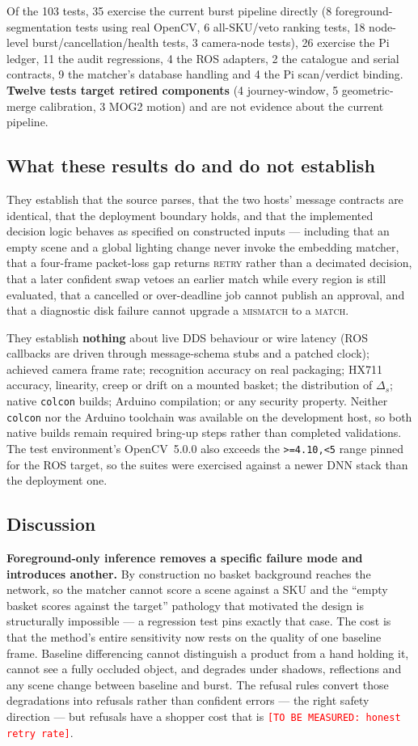 \documentclass[conference]{IEEEtran}
\newcommand{\tbm}[1]{\textcolor{red}{\texttt{[TO BE MEASURED: #1]}}}
\begin{document}
Of the 103 tests, 35 exercise the current burst pipeline directly (8 foreground-segmentation tests
using real OpenCV, 6 all-SKU/veto ranking tests, 18 node-level burst/cancellation/health tests, 3
camera-node tests), 26 exercise the Pi ledger, 11 the audit regressions, 4 the ROS adapters, 2 the
catalogue and serial contracts, 9 the matcher's database handling and 4 the Pi scan/verdict binding.
\textbf{Twelve tests target retired components} (4 journey-window, 5 geometric-merge calibration, 3
MOG2 motion) and are not evidence about the current pipeline.

\subsection{What these results do and do not establish}
They establish that the source parses, that the two hosts' message contracts are identical, that the
deployment boundary holds, and that the implemented decision logic behaves as specified on constructed
inputs --- including that an empty scene and a global lighting change never invoke the embedding
matcher, that a four-frame packet-loss gap returns \textsc{retry} rather than a decimated decision,
that a later confident swap vetoes an earlier match while every region is still evaluated, that a
cancelled or over-deadline job cannot publish an approval, and that a diagnostic disk failure cannot
upgrade a \textsc{mismatch} to a \textsc{match}.

They establish \textbf{nothing} about live DDS behaviour or wire latency (ROS callbacks are driven
through message-schema stubs and a patched clock); achieved camera frame rate; recognition accuracy on
real packaging; HX711 accuracy, linearity, creep or drift on a mounted basket; the distribution of
$\Delta_s$; native \texttt{colcon} builds; Arduino compilation; or any security property. Neither
\texttt{colcon} nor the Arduino toolchain was available on the development host, so both native builds
remain required bring-up steps rather than completed validations. The test environment's OpenCV~5.0.0
also exceeds the \texttt{>=4.10,<5} range pinned for the ROS target, so the suites were exercised
against a newer DNN stack than the deployment one.

\subsection{Discussion}
\textbf{Foreground-only inference removes a specific failure mode and introduces another.} By
construction no basket background reaches the network, so the matcher cannot score a scene against a
SKU and the ``empty basket scores against the target'' pathology that motivated the design is
structurally impossible --- a regression test pins exactly that case. The cost is that the method's
entire sensitivity now rests on the quality of one baseline frame. Baseline differencing cannot
distinguish a product from a hand holding it, cannot see a fully occluded object, and degrades under
shadows, reflections and any scene change between baseline and burst. The refusal rules convert those
degradations into refusals rather than confident errors --- the right safety direction --- but refusals
have a shopper cost that is \tbm{honest retry rate}.
\end{document}
